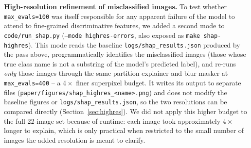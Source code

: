 \textbf{High-resolution refinement of misclassified images.} To test
whether \texttt{max\_evals=100} was itself responsible for any apparent
failure of the model to attend to fine-grained discriminative features, we
added a second mode to \texttt{code/run\_shap.py}
(\texttt{--mode highres-errors}, also exposed as \texttt{make
shap-highres}). This mode reads the baseline \texttt{logs/shap\_results.json}
produced by the pass above, programmatically identifies the misclassified
images (those whose true class name is not a substring of the model's
predicted label), and re-runs \emph{only} those images through the same
partition explainer and blur masker at \texttt{max\_evals=400} -- a
$4\times$ finer superpixel budget. It writes its output to separate files
(\texttt{paper/figures/shap\_highres\_<name>.png}) and does not modify the
baseline figures or \texttt{logs/shap\_results.json}, so the two resolutions
can be compared directly (Section~\ref{sec:highres}). We did not apply this
higher budget to the full 22-image set because of runtime: each image took
approximately $4\times$ longer to explain, which is only practical when
restricted to the small number of images the added resolution is meant to
clarify.
